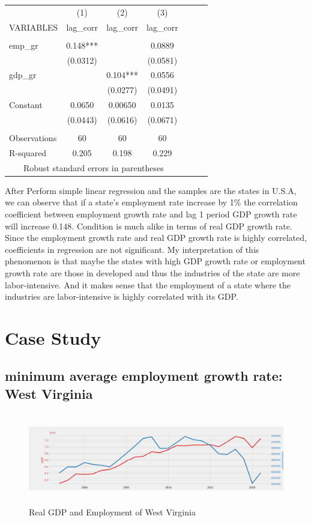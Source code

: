 \documentclass{article}
\begin{document}
\begin{center}
\begin{tabular}{lcccccc} \hline
    & (1) & (2) & (3) \\
    VARIABLES & lag\_corr & lag\_corr & lag\_corr \\ \hline
     &  &  &  \\
    emp\_gr & 0.148*** &  & 0.0889 \\
     & (0.0312) &  & (0.0581) \\
    gdp\_gr &  & 0.104*** & 0.0556 \\
     &  & (0.0277) & (0.0491) \\
    Constant & 0.0650 & 0.00650 & 0.0135 \\
     & (0.0443) & (0.0616) & (0.0671) \\
     &  &  &  \\
    Observations & 60 & 60 & 60 \\
     R-squared & 0.205 & 0.198 & 0.229 \\ \hline
    \multicolumn{4}{c}{ Robust standard errors in parentheses} \\
\end{tabular}
\end{center}

After Perform simple linear regression and the samples are the states in U.S.A,
we can observe that if a state's employment rate increase by 1\% the correlation 
coefficient between employment growth rate and lag 1 period GDP growth rate will
increase 0.148. Condition is much alike in terms of real GDP growth rate. Since
the employment growth rate and real GDP growth rate is highly correlated, coefficients
in regression are not significant. My interpretation of this phenomenon is that
maybe the states with high GDP growth rate or employment growth rate are those
in developed and thus the industries of the state are more labor-intensive. And
it makes sense that the employment of a state where the industries are labor-intensive
is highly correlated with its GDP.

\section{Case Study}
\subsection{minimum average employment growth rate: West Virginia}
\begin{figure}[h]
	\centering
	\includegraphics[width=12cm, height=4cm]{res/wv.png}
	\caption{Real GDP and Employment of West Virginia}
\end{figure}
\end{document}
